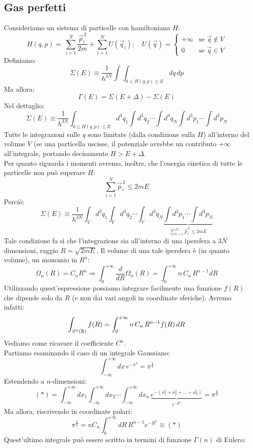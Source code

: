 \documentclass[../MeccanicaStatistica.tex]{subfiles}
\begin{document}
\subsection{Gas perfetti}
Consideriamo un sistema di particelle con hamiltoniana $H$:
\[
H(q,p) =\ \sum_{i=1}^N \frac{\vec{p}_i^{\,2}}{2m}+\sum_{i=1}^N U(\vec{q}_i); \quad U(\vec{q}) = \begin{cases}
+\infty &\text{se } \vec{q}\notin V\\
0 &\text{se } \vec{q}\in V
\end{cases}
\]
Definiamo:
\[
\Sigma(E)\equiv \frac{1}{h^{3N}}\int \int_{0\leq H(q,p)\leq E} dq\,dp
\]
Ma allora:
\[
\Gamma(E) = \Sigma(E+\Delta)-\Sigma(E)
\]
Nel dettaglio:
\[
\Sigma(E) \equiv \frac{1}{h^{3N}} \int_{0\leq H(q,p)\leq E} d^3q_1\int d^3q_2\cdots \int d^3q_N\int d^3 p_1\cdots \int d^3p_N
\]
Tutte le integrazioni sulle $q$ sono limitate (dalla condizione sulla $H$) all'interno del volume $V$ (se una particella uscisse, il potenziale avrebbe un contributo $+\infty$ all'integrale, portando decisamente $H>E+\Delta$.\\
Per quanto riguarda i momenti avremo, inoltre, che l'energia cinetica di tutte le particelle non può superare $H$:
\[
\sum_{i=1}^N \vec{p}_i^{\,2}\leq 2mE
\]
Perciò:
\[
\Sigma(E) \equiv \frac{1}{h^{3N}} \int_V d^3q_1\int_V d^3q_2\cdots \int_V d^3q_N\underbrace{\int d^3 p_1\cdots \int d^3p_N}_{\sum_{i=1}^N \vec{p}_i^{\,2}\leq 2mE}
\]
Tale condizione fa sì che l'integrazione sia all'interno di una ipersfera a $3N$ dimensioni, raggio $R=\sqrt{2mE}$. Il volume di una tale ipersfera è (in quanto volume), un monomio in $R^n$:
\[
\Omega_n(R) = C_n R^n \Rightarrow \int_0^{+\infty} \frac{d}{dR}\Omega_n(R) = \int_0^{+\infty} n\, C_n\,R^{n-1}dR
\]
Utilizzando quest'espressione possiamo integrare facilmente una funzione $f(R)$ che dipende solo da $R$ (e non dai vari angoli in coordinate sferiche). Avremo infatti:
\[
\int_{S^n(\mathbb{R})} f(R) = \int_{0}^{+\infty} n\,C_n\,R^{n-1}f(R)\,dR
\]
Vediamo come ricavare il coefficiente $C^n$.\\
Partiamo esaminando il caso di un integrale Gaussiano:
\[
\int_{-\infty}^{+\infty} dx\,e^{-x^2} =\pi^{\frac{1}{2}}
\]
Estendendo a $n$-dimensioni:
\[
(*)=\int_{-\infty}^{+\infty} dx_1 \int_{-\infty}^{+\infty} dx_2 \cdots \int_{-\infty}^{+\infty} dx_n\, \underbrace{e^{-(x_1^2+x_2^2+\dots+x_n^2)}}_{e^{-R^2}}=\pi^{\frac{n}{2}}
\]
Ma allora, riscrivendo in coordinate polari:
\[
\pi^{\frac{n}{2}} = nC_n\int_0^{+\infty} dR\,R^{n-1}e^{-R^2}\equiv (*)
\]
Quest'ultimo integrale può essere scritto in termini di funzione $\Gamma(n)$ di Eulero:
\end{document}
